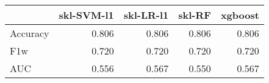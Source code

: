 \begin{tabular}{lrrrr}
\toprule
{} &  skl-SVM-l1 &  skl-LR-l1 &  skl-RF &  xgboost \\
\midrule
Accuracy &       0.806 &      0.806 &   0.806 &    0.806 \\
F1w      &       0.720 &      0.720 &   0.720 &    0.720 \\
AUC      &       0.556 &      0.567 &   0.550 &    0.567 \\
\bottomrule
\end{tabular}

